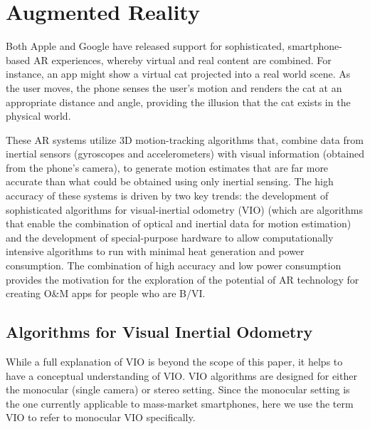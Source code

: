 \documentclass[chi_draft]{sigchi}
\newcommand{\BVI}{B/VI\xspace}
\newcommand{\OM}{O\&M\xspace}
\begin{document}
\section{Augmented Reality}
%

Both Apple and Google have released support for sophisticated, smartphone-based AR experiences, whereby virtual and real content are combined.  For instance, an app might show a virtual cat projected into a real world scene.  As the user moves, the phone senses the user's motion and renders the cat at an appropriate distance and angle, providing the illusion that the cat exists in the physical world.

These AR systems utilize 3D motion-tracking algorithms that, combine data from inertial sensors (gyroscopes and accelerometers) with visual information (obtained from the phone's camera), to generate motion estimates that are far more accurate than what could be obtained using only inertial sensing.  The high accuracy of these systems is driven by two key trends: the development of sophisticated algorithms for visual-inertial odometry (VIO) \cite{li2013high,leutenegger2015keyframe,bloesch2015robust,forster2014svo} (which are algorithms that enable the combination of optical and inertial data for motion estimation) and the development of special-purpose hardware to allow computationally intensive algorithms to run with minimal heat generation and power consumption.  The combination of high accuracy and low power consumption provides the motivation for the exploration of the potential of AR technology for creating \OM apps for people who are \BVI.

\subsection{Algorithms for Visual Inertial Odometry}
While a full explanation of VIO \cite{gui2015review} is beyond the scope of this paper, it helps to have a conceptual understanding of VIO.  VIO algorithms are designed for either the monocular (single camera) or stereo setting.  Since the monocular setting is the one currently applicable to mass-market smartphones, here we use the term VIO to refer to monocular VIO specifically.
\end{document}
